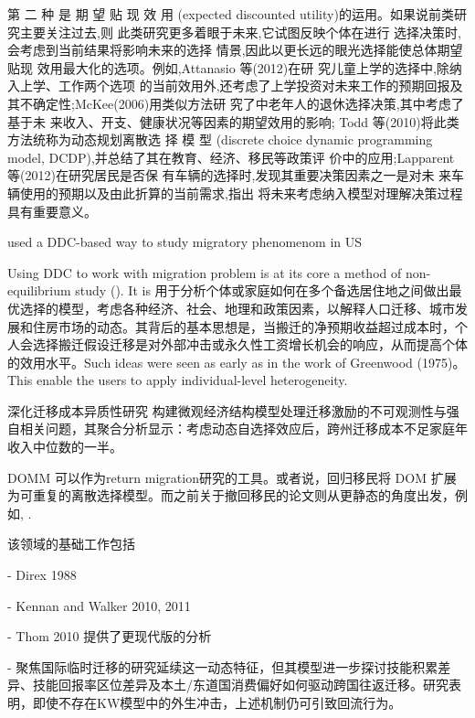 \documentclass[a4paper,12pt,oneside]{book} %
\begin{document}
第 二 种 是 期 望 贴 现 效 用 (expected discounted utility)的运用。如果说前类研究主要关注过去,则 此类研究更多着眼于未来,它试图反映个体在进行 选择决策时,会考虑到当前结果将影响未来的选择 情景,因此以更长远的眼光选择能使总体期望贴现 效用最大化的选项。例如,Attanasio 等(2012)在研 究儿童上学的选择中,除纳入上学、工作两个选项 的当前效用外,还考虑了上学投资对未来工作的预期回报及其不确定性;McKee(2006)用类似方法研 究了中老年人的退休选择决策,其中考虑了基于未 来收入、开支、健康状况等因素的期望效用的影响; Todd 等(2010)将此类方法统称为动态规划离散选 择 模 型 (discrete choice dynamic programming model, DCDP),并总结了其在教育、经济、移民等政策评 价中的应用;Lapparent 等(2012)在研究居民是否保 有车辆的选择时,发现其重要决策因素之一是对未 来车辆使用的预期以及由此折算的当前需求,指出 将未来考虑纳入模型对理解决策过程具有重要意义。

\cite{kennanEffectExpectedIncome2011} used a DDC-based way to study migratory phenomenom in US

Using DDC to work with migration problem is at its core a method of non-equilibrium study (\cite{jiaEconomicsInternalMigration2023}). 
It is 用于分析个体或家庭如何在多个备选居住地之间做出最优选择的模型，考虑各种经济、社会、地理和政策因素，以解释人口迁移、城市发展和住房市场的动态。其背后的基本思想是，当搬迁的净预期收益超过成本时，个人会选择搬迁假设迁移是对外部冲击或永久性工资增长机会的响应，从而提高个体的效用水平。Such ideas were seen as early as in the work of Greenwood (1975)。This enable the users to apply individual-level heterogeneity.

深化迁移成本异质性研究
\cite{bayerDynamicsInterstateMigration2012}构建微观经济结构模型处理迁移激励的不可观测性与强自相关问题，其聚合分析显示：考虑动态自选择效应后，跨州迁移成本不足家庭年收入中位数的一半。


DOMM 可以作为return migration研究的工具。或者说，回归移民将 DOM 扩展为可重复的离散选择模型。而之前关于撤回移民的论文则从更静态的角度出发，例如\cite{RenYuanNongCunWaiChuLaoDongLiHuiLiuQianYiDeYingXiangYinSuHeHuiLiuXiaoYing2017}, \cite{ShiZhiLeiJiaTingBingFuJiaTingJueCeYuNongCunQianYiLaoDongLiHuiLiu2012}.

该领域的基础工作包括

- Direx 1988

- Kennan and Walker 2010, 2011

- Thom 2010 提供了更现代版的分析

- \cite{dustmannEconomicsTemporaryMigrations2016}聚焦国际临时迁移的研究延续这一动态特征，但其模型进一步探讨技能积累差异、技能回报率区位差异及本土/东道国消费偏好如何驱动跨国往返迁移。研究表明，即使不存在KW模型中的外生冲击，上述机制仍可引致回流行为。
\end{document}
